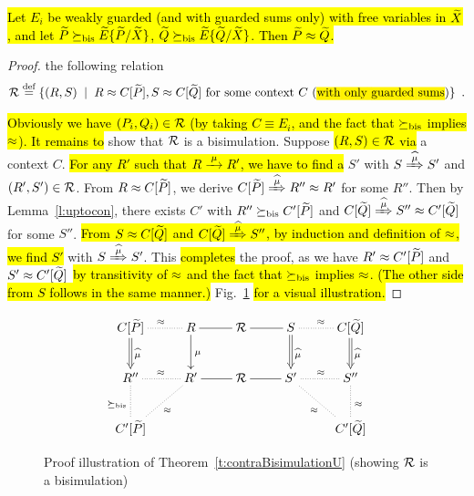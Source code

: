 \begin{theorem}
\label{t:contraBisimulationU} %
\hl{Let $E_i$ be weakly guarded (and with guarded sums only) with free
variables in $\widetilde X$, and let $\widetilde P \mathrel{\succeq_{\rm{bis}}} \widetilde E\{\widetilde P/\widetilde X\}$,
    $\widetilde Q \mathrel{\succeq_{\rm{bis}}} \widetilde E\{\widetilde Q/\widetilde X\}$. Then $\widetilde P \approx \widetilde Q$.}
\end{theorem}

\begin{proof}
 the following relation
\begin{equation*}
\R \DSdefi \{(R,S) \st R \wb \ct{\til P}, S \wb \ct{\til Q} \mbox{~for some context
$\qct$ (\hl{with only guarded sums})} \} \enspace.
\end{equation*}

\hl{Obviously we have $(P_i,Q_i) \in {\cal R}$ (by taking $C \equiv E_i$, and
the fact that $\mathrel{\succeq_{\rm{bis}}}$ implies $\approx$). It remains to}
show that ${\cal R}$ is a bisimulation. Suppose \hl{$(R, S) \in {\cal R}$ via} a context
$C$. \hl{For any $R'$ such that $R \arr{\mu} R'$, we have to find a} $S'$ with $S \Arcap{\mu}
S'$ and $(R', S') \in {\cal R}$. From $R \approx C[{\widetilde P}]$, we derive $C[{\til P}]
\Arcap{\mu} R'' \wb R'$ for some $R''$. Then by Lemma~\ref{l:uptocon},
there exists $C'$ with $R'' \mathrel{\succeq_{\rm{bis}}} C'[{\widetilde P}]$ and $C[{\til Q}]
\Arcap{\mu} S'' \wb C'[{\til Q}]$ for some $S''$. \hl{From $S \approx C[{\widetilde
  Q}]$ and $C[{\til Q}] \Arcap{\mu} S''$, by induction and definition of $\approx$, we find
 $S'$} with $S \Arcap{\mu} S'$. This \hl{completes} the
proof, as we have $R' \approx C'[{\widetilde P}]$ and $S' \approx C'[{\widetilde Q}]$ \hl{by
transitivity of $\approx$ and the fact that $\mathrel{\succeq_{\rm{bis}}}$ implies $\approx$.
(The other side from $S$ follows in the same manner.)}
 Fig.~\ref{fig:310} \hl{for a visual illustration.}
\end{proof}

\begin{figure}[ht]
\begin{displaymath}
  \xymatrix{
    {C[{\til P}]} \ar@{.}[r]^{\wb} \ar@{=>}[d]^{\widehat{\mu}} & {R} \ar@{-}[r]
    \ar@{->}[d]^{\mu} & {\R} \ar@{-}[r] & {S} \ar@{.}[r]^{\wb}
    \ar@{=>}[d]^{\widehat{\mu}} & {C[{\til Q}]} \ar@{=>}[d]^{\widehat{\mu}} \\
    {R''} \ar@{.}[d]_{\mcontrBIS} \ar@{.}[r]^{\wb} & {R'} \ar@{-}[r]
    \ar@{.}[ld]^{\wb} & {\R} \ar@{-}[r] & {S'} \ar@{.}[r]^{\wb} \ar@{.}[rd]_{\wb}
    & {S''} \ar@{.}[d]^{\wb} \\
    {C'[{\til P}]} & {} & {} & {} & {C'[{\til Q}]}
  }
\end{displaymath}
\caption{Proof illustration of Theorem~\ref{t:contraBisimulationU}
  (showing ${\cal R}$ is a bisimulation)}
\label{fig:310}
\end{figure}

